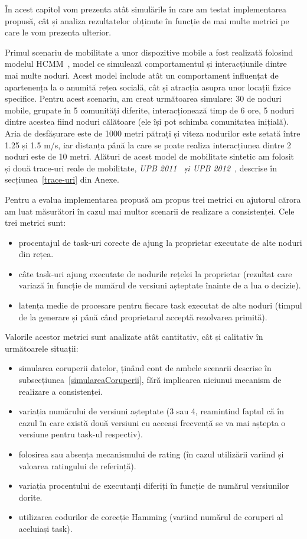 \documentclass[12pt,a4paper]{report}
\begin{document}
În acest capitol vom prezenta atât simulările în care am testat implementarea propusă, cât și analiza rezultatelor obținute în funcție de mai multe metrici pe care le vom prezenta ulterior.

Primul scenariu de mobilitate a unor dispozitive mobile a fost realizată folosind modelul HCMM~\cite{hcmm}, model ce simulează comportamentul și interacțiunile dintre mai multe noduri. Acest model include atât un comportament influențat de apartenența la o anumită rețea socială, cât și atracția asupra unor locații fizice specifice. Pentru acest scenariu, am creat următoarea simulare: 30 de noduri mobile, grupate în 5 comunități diferite, interacționează timp de 6 ore, 5 noduri dintre acestea fiind noduri călătoare (ele își pot schimba comunitatea inițială). Aria de desfășurare este de 1000 metri pătrați și viteza nodurilor este setată între 1.25 și 1.5 m/s, iar distanța până la care se poate realiza interacțiunea dintre 2 noduri este de 10 metri. Alături de acest model de mobilitate sintetic am folosit și două trace-uri reale de mobilitate, \textit{UPB 2011~\cite{upb2011} și UPB 2012~\cite{upb2012}}, descrise în secțiunea~\ref{trace-uri} din Anexe. 

Pentru a evalua implementarea propusă am propus trei metrici cu ajutorul cărora am luat măsurători în cazul mai multor scenarii de realizare a consistenței. Cele trei metrici sunt:
\begin{itemize}
	\item procentajul de task-uri corecte de ajung la proprietar executate de alte noduri din rețea.
	\item câte task-uri ajung executate de nodurile rețelei la proprietar (rezultat care variază în funcție de numărul de versiuni așteptate înainte de a lua o decizie).
	\item latența medie de procesare pentru fiecare task executat de alte noduri (timpul de la generare și până când proprietarul acceptă rezolvarea primită).
\end{itemize}
Valorile acestor metrici sunt analizate atât cantitativ, cât și calitativ în următoarele situații:
\begin{itemize}
	\item simularea coruperii datelor, ținând cont de ambele scenarii descrise în subsecțiunea~\ref{simulareaCoruperii}, fără implicarea niciunui mecanism de realizare a consistenței.
	\item variația numărului de versiuni așteptate (3 sau 4, reamintind faptul că în cazul în care există două versiuni cu aceeași frecvență se va mai aștepta o versiune pentru task-ul respectiv).
	\item folosirea sau absența mecanismului de rating (în cazul utilizării variind și valoarea ratingului de referință).
	\item variația procentului de executanți diferiți în funcție de numărul versiunilor dorite.
	\item utilizarea codurilor de corecție Hamming (variind numărul de coruperi al aceluiași task).
\end{itemize}
\end{document}
